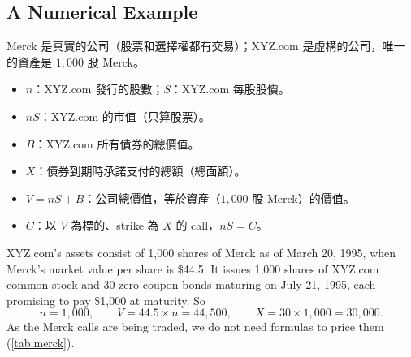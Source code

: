 \subsection{A Numerical Example}
\label{sec:merck-example}


\begin{notation}
	Merck 是真實的公司（股票和選擇權都有交易）；XYZ.com 是虛構的公司，唯一的資產是 $1{,}000$ 股 Merck。
	\begin{itemize}[nosep]
		\item $n$：XYZ.com 發行的股數；$S$：XYZ.com 每股股價。
		\item $nS$：XYZ.com 的市值（只算股票）。
		\item $B$：XYZ.com 所有債券的總價值。
		\item $X$：債券到期時承諾支付的總額（總面額）。
		\item $V=nS+B$：公司總價值，等於資產（$1{,}000$ 股 Merck）的價值。
		\item $C$：以 $V$ 為標的、strike 為 $X$ 的 call，$nS=C$。
	\end{itemize}
\end{notation}
\suppend

XYZ.com's assets consist of 1,000 shares of Merck as of March 20, 1995, when Merck's market value per share is \$44.5.
It issues 1,000 shares of XYZ.com common stock and 30 zero-coupon bonds maturing on July 21, 1995, each promising to pay \$1,000 at maturity.
So
\[
	n=1{,}000 , \qquad V=44.5\times n=44{,}500 , \qquad X=30\times1{,}000=30{,}000 .
\]
As the Merck calls are being traded, we do not need formulas to price them (\autoref{tab:merck}).

\suppstart
{}
\suppend

